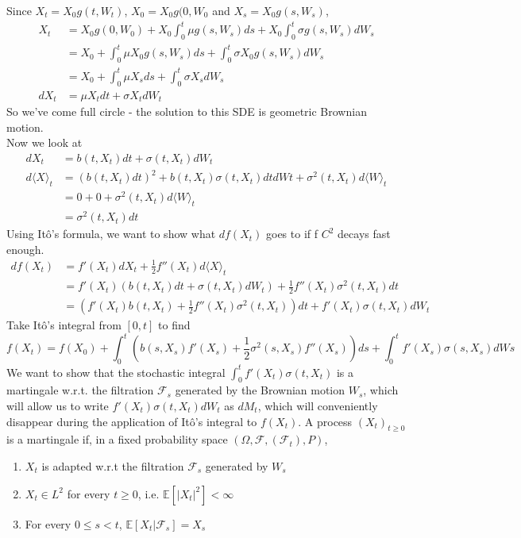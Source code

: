 \documentclass{article}
\begin{document}
Since $X_t = X_0 g(t, W_t)$, $X_0 = X_0 g(0, W_0$ and $X_s = X_0 g(s, W_s)$, 
\begin{align*}
    X_t &= X_0 g(0, W_0) + X_0\int_0^t \mu g(s, W_s)ds + X_0\int_0^t\sigma g(s, W_s)dW_s\\
    &= X_0 + \int_0^t\mu X_0 g(s, W_s) ds + \int_0^t \sigma X_0 g(s, W_s) dW_s\\
    &= X_0 + \int_0^t \mu X_s ds + \int_0^t \sigma X_s dW_s\\
    dX_t &= \mu X_t dt + \sigma X_t dW_t
\end{align*}
So we've come full circle - the solution to this SDE is geometric Brownian motion.\\
Now we look at
\begin{align*}
    dX_t &= b(t, X_t)dt + \sigma(t, X_t)dW_t\\
    d\langle X \rangle_t &= (b(t, X_t)dt)^2 + b(t, X_t)\sigma(t, X_t)dtdWt + \sigma^2(t, X_t)d \langle W \rangle _ t \\
    &= 0 + 0 + \sigma^2(t, X_t)d \langle W \rangle _ t\\
    &= \sigma^2(t, X_t)dt
\end{align*}
Using It\^{o}'s formula, we want to show what $df(X_t)$ goes to if f $C^2$ decays fast enough.
\begin{align*}
    df(X_t) &= f'(X_t)dX_t + \frac{1}{2}f''(X_t)d\langle X \rangle_t\\
    &=f'(X_t)(b(t, X_t)dt + \sigma(t, X_t)dW_t) + \frac{1}{2}f''(X_t)\sigma^2(t, X_t)dt\\
    &=(f'(X_t)b(t, X_t) + \frac{1}{2}f''(X_t)\sigma^2(t, X_t))dt + f'(X_t)\sigma(t, X_t)dW_t
\end{align*}
Take It\^{o}'s integral from $[0, t]$ to find 
\begin{equation*}
    f(X_t) = f(X_0) + \int_0^t(b(s, X_s)f'(X_s) + \frac{1}{2}\sigma^2(s, X_s)f''(X_s))ds + \int_0^tf'(X_s)\sigma(s, X_s)dWs
\end{equation*}
We want to show that the stochastic integral  $\int_0^tf'(X_t)\sigma(t, X_t)$ is a martingale w.r.t. the filtration $\mathcal{F}_s$ generated by the Brownian motion $W_s$, which will allow us to write $f'(X_t)\sigma(t, X_t)dW_t$ as $dM_t$, which will conveniently disappear during the application of It\^{o}'s integral to $f(X_t)$. A process $(X_t)_{t\geq 0}$ is a martingale if, in a fixed probability space $(\Omega, \mathcal{F}, (\mathcal{F}_t), P)$,
\begin{enumerate}[label=(\roman*)]
    \item $X_t$ is adapted w.r.t the filtration $\mathcal{F}_s$ generated by $W_s$
    \item $X_t \in L^2$ for every $t \geq 0$, i.e. $\mathbb{E}[|X_t|^2] < \infty$
    \item For every $0 \leq s < t$, $\mathbb{E}[X_t | \mathcal{F}_s] = X_s$
\end{enumerate}
\end{document}
